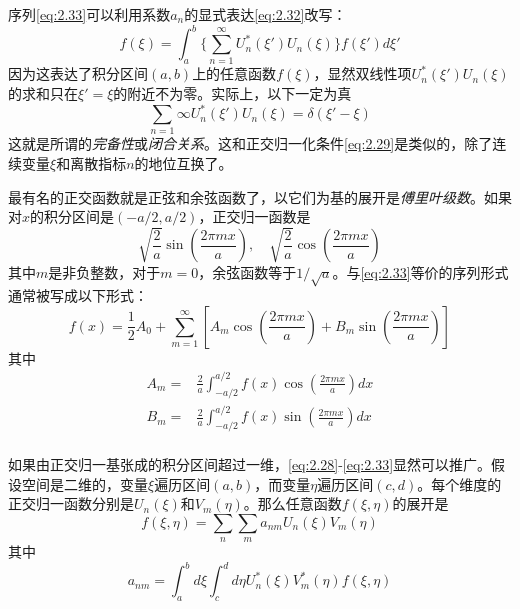 \documentclass[12pt]{book}
\numberwithin{equation}{chapter}
\numberwithin{figure}{chapter}
\numberwithin{footnote}{page}
\begin{document}
序列\autoref{eq:2.33}可以利用系数$a_n$的显式表达\autoref{eq:2.32}改写：
\begin{equation}\label{eq:2.34}
    f(\xi)=\int_a^b \{ \sum_{n=1}^\infty U_n^*(\xi')U_n(\xi)\} f(\xi') d\xi'
\end{equation}
因为这表达了积分区间$(a,b)$上的任意函数$f(\xi)$，显然双线性项$U_n^*(\xi')U_n(\xi)$的求和只在$\xi'=\xi$的附近不为零。实际上，以下一定为真
\begin{equation}\label{eq:2.35}
    \sum_{n=1}\infty U_n^*(\xi')U_n(\xi)=\delta(\xi'-\xi)
\end{equation}
这就是所谓的\textit{完备性}或\textit{闭合关系}。这和正交归一化条件\autoref{eq:2.29}是类似的，除了连续变量$\xi$和离散指标$n$的地位互换了。

最有名的正交函数就是正弦和余弦函数了，以它们为基的展开是\textit{傅里叶级数}。如果对$x$的积分区间是$(-a/2,a/2)$，正交归一函数是
$$\sqrt{\frac{2}{a}}\sin(\frac{2\pi mx}{a}),\quad \sqrt{\frac{2}{a}}\cos(\frac{2\pi mx}{a})$$
其中$m$是非负整数，对于$m=0$，余弦函数等于$1/\sqrt{a}$。与\autoref{eq:2.33}等价的序列形式通常被写成以下形式：
\begin{equation}\label{eq:2.36}
    f(x)=\frac{1}{2}A_0 + \sum_{m=1}^\infty [A_m \cos(\frac{2\pi mx}{a})+B_m \sin(\frac{2\pi mx}{a})]
\end{equation}
其中
\begin{equation}
    \begin{aligned}
        A_m=&\frac{2}{a}\int_{-a/2}^{a/2} f(x)\cos(\frac{2\pi mx}{a}) dx\\
        B_m=&\frac{2}{a}\int_{-a/2}^{a/2} f(x)\sin(\frac{2\pi mx}{a}) dx\\
    \end{aligned}
\end{equation}

如果由正交归一基张成的积分区间超过一维，\autoref{eq:2.28}-\autoref{eq:2.33}显然可以推广。假设空间是二维的，变量$\xi$遍历区间$(a,b)$，而变量$\eta$遍历区间$(c,d)$。每个维度的正交归一函数分别是$U_n(\xi)$和$V_m(\eta)$。那么任意函数$f(\xi,\eta)$的展开是
\begin{equation}\label{eq:2.38}
    f(\xi,\eta)=\sum_n \sum_m a_{nm}U_n(\xi)V_m(\eta)
\end{equation}
其中
\begin{equation}\label{eq:2.39}
    a_{nm}=\int_a^b d\xi \int_c^d d\eta U_n^*(\xi)V_m^*(\eta)f(\xi,\eta)
\end{equation}
\end{document}
